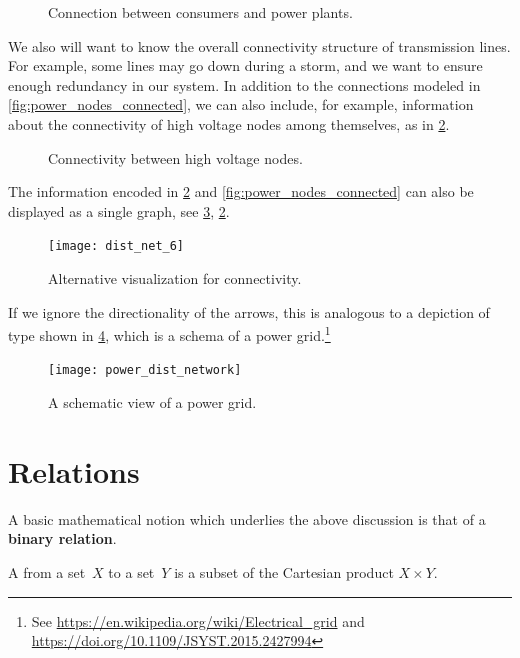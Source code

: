 \begin{figure}[h!]
  \centering
  \caption{Connection between consumers and power plants.}
  \label{fig:power_paths}
\end{figure}


We also will want to know the overall connectivity structure of transmission lines. For example, some lines may go down during a storm, and we want to ensure enough redundancy in our system. In addition to the connections modeled in \cref{fig:power_nodes_connected}, we can also include, for example, information about the connectivity of high voltage nodes among themselves, as in \cref{fig:power_internodal}.

\begin{figure}[h!]
  \centering
  \caption{Connectivity between high voltage nodes.}
  \label{fig:power_internodal}
\end{figure}
The information encoded in \cref{fig:power_internodal} and \cref{fig:power_nodes_connected} can also be displayed as a single graph, see \cref{fig:power_graph},
\cref{fig:power_internodal}.
\begin{figure}[h!]
  \centering
  \texttt{[image: dist\_net\_6]}
  \caption{Alternative visualization for connectivity.}
  \label{fig:power_graph}
\end{figure}
If we ignore the directionality of the arrows, this is analogous to a depiction of type shown in \cref{fig:power_schema}, which is a schema of a power grid.\footnote{See \url{https://en.wikipedia.org/wiki/Electrical_grid} and \url{https://doi.org/10.1109/JSYST.2015.2427994}}

\begin{figure}[h!]
  \centering
  \texttt{[image: power\_dist\_network]}
  \caption{A schematic view of a power grid.}
  \label{fig:power_schema}
\end{figure}

\section{Relations}

A basic mathematical notion which underlies the above discussion is that of a \textbf{binary relation}.


\begin{definition}
  A \emph{} from a set~$X$ to a set~$Y$ is a subset of the Cartesian product $X\times Y$.
\end{definition}

